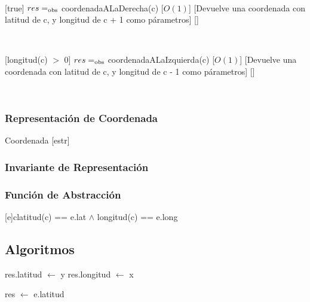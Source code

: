 \begin{Interfaz}
~

[true]
{$res =_{\mathrm{obs}}$ coordenadaALaDerecha(c)}
[$O(1)$]
[Devuelve una coordenada con latitud de c, y longitud de c + 1 como párametros]
[]

~

[longitud(c) $>$ 0]
{$res =_{\mathrm{obs}}$ coordenadaALaIzquierda(c)}
[$O(1)$]
[Devuelve una coordenada con latitud de c, y longitud de c - 1 como párametros]
[]

~

\subsubsection{Representación de Coordenada}

\begin{Estructura}{ Coordenada }[estr]
	\begin{Tupla}[estr]
	\end{Tupla}

\end{Estructura}


\subsubsection{Invariante de Representación}


\subsubsection{Función de Abstracción}

[e]{c}{latitud(c) == e.lat $\land$ longitud(c) == e.long}

\subsection{Algoritmos}

\begin{algorithm}[H]
	\SetAlgoLined
	\NoCaptionOfAlgo
	\caption{}
	res.latitud $\leftarrow$ y\;
	res.longitud $\leftarrow$ x\;
\end{algorithm}

\begin{algorithm}[H]
	\SetAlgoLined
	\NoCaptionOfAlgo
	\caption{}
	res $\leftarrow$ e.latitud\;
\end{algorithm}


\end{Interfaz}
